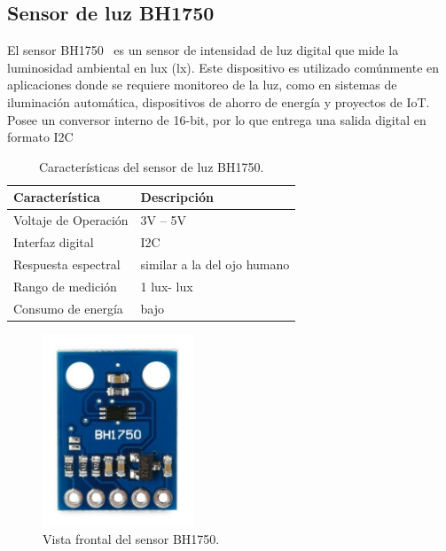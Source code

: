 \subsection{Sensor de luz BH1750}

El sensor BH1750~\cite{manual:BH1750} es un sensor de intensidad de luz digital que mide la luminosidad ambiental en lux (lx). Este dispositivo es utilizado comúnmente en aplicaciones donde se requiere monitoreo de la luz, como en sistemas de iluminación automática, dispositivos de ahorro de energía y proyectos de IoT.
Posee un conversor interno de 16-bit, por lo que entrega una salida digital en formato I2C

\begin{table}[htbp]
\begin{center}
\caption{Características del sensor de luz BH1750.}
\begin{tabular}{|l|l|}
\hline
\rowcolor[HTML]{C0C0C0} 
\textbf{Característica} & \textbf{Descripción}\\ \hline
Voltaje de Operación &  3V – 5V \\ \hline
Interfaz digital & I2C \\ \hline
Respuesta espectral & similar a la del ojo humano \\ \hline
Rango de medición & 1 lux\quad-\quad65535 lux \\ \hline
Consumo de energía & bajo \\ \hline
\end{tabular}
\end{center}
\end{table}

\begin{figure}[h]
    \centering
    \includegraphics[width=0.4\textwidth]{img/herramientas/bh1750_cara.png}
    \caption{Vista frontal del sensor BH1750.}
\end{figure}
\pagebreak

